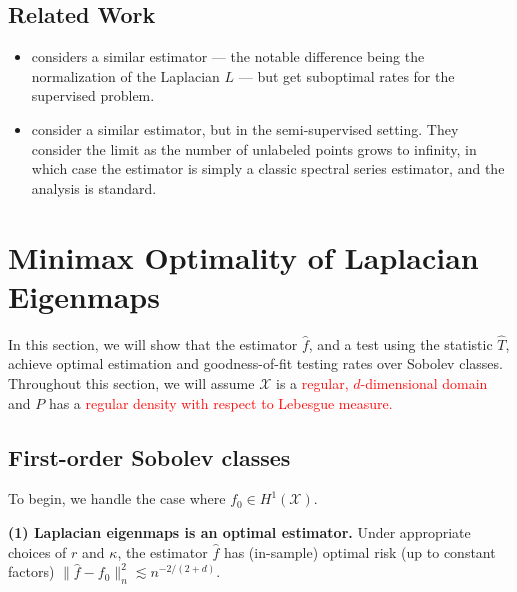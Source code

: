 \documentclass{article}
\newcommand{\1}{\mathbf{1}}
\newcommand{\mc}[1]{\mathcal{#1}}
\newcommand{\wh}[1]{\widehat{#1}}
\theoremstyle{alden}
\theoremstyle{aldenthm}
\theoremstyle{definition}
\theoremstyle{remark}
\begin{document}
\subsection{Related Work}
\begin{itemize}
	\item \cite{lee2016} considers a similar estimator --- the notable difference being the normalization of the Laplacian $L$ --- but get suboptimal rates for the supervised problem. 
	\item \cite{zhou2011} consider a similar estimator, but in the semi-supervised setting. They consider the limit as the number of unlabeled points grows to infinity, in which case the estimator is simply a classic spectral series estimator, and the analysis is standard. 
\end{itemize}

\section{Minimax Optimality of Laplacian Eigenmaps}
\label{sec:minimax_optimal_laplacian_eigenmaps}

In this section, we will show that the estimator $\wh{f}$, and a test using the statistic $\wh{T}$, achieve optimal estimation and goodness-of-fit testing rates over Sobolev classes. Throughout this section, we will assume $\mc{X}$ is a \textcolor{red}{regular, $d$-dimensional domain} and $P$ has a \textcolor{red}{regular density with respect to Lebesgue measure.}

\subsection{First-order Sobolev classes}
\label{sec:first_order_sobolev_classes}
To begin, we handle the case where $f_0 \in H^1(\mc{X})$.

\textbf{(1) Laplacian eigenmaps is an optimal estimator.} Under appropriate choices of $r$ and $\kappa$, the estimator $\wh{f}$ has (in-sample) optimal risk (up to constant factors) $\|\wh{f} - f_0\|_n^2 \lesssim n^{-2/(2 + d)}$. 
\end{document}
